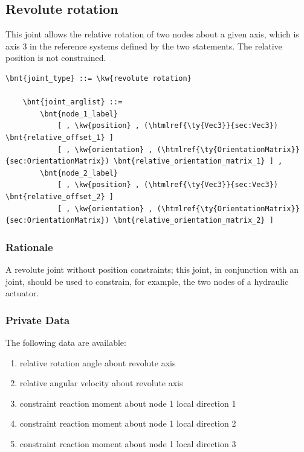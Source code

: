 \subsection{Revolute rotation}
\label{sec:EL:STRUCT:JOINT:REVOLUTE_ROTATION}
This joint allows the relative rotation of two nodes about
a given axis, which is axis 3 in the reference systems defined 
by the two  statements.
The relative position is not constrained.
\begin{Verbatim}[commandchars=\\\{\}]
    \bnt{joint_type} ::= \kw{revolute rotation}

    \bnt{joint_arglist} ::= 
        \bnt{node_1_label}
            [ , \kw{position} , (\htmlref{\ty{Vec3}}{sec:Vec3}) \bnt{relative_offset_1} ]
            [ , \kw{orientation} , (\htmlref{\ty{OrientationMatrix}}{sec:OrientationMatrix}) \bnt{relative_orientation_matrix_1} ] ,
        \bnt{node_2_label}
            [ , \kw{position} , (\htmlref{\ty{Vec3}}{sec:Vec3}) \bnt{relative_offset_2} ]
            [ , \kw{orientation} , (\htmlref{\ty{OrientationMatrix}}{sec:OrientationMatrix}) \bnt{relative_orientation_matrix_2} ]
\end{Verbatim}

\subsubsection{Rationale}
A revolute joint without position constraints; this joint, in conjunction
with an  joint, should be used to constrain, for example,
the two nodes of a hydraulic actuator.

\subsubsection{Private Data}
The following data are available:
\begin{enumerate}
\item {} relative rotation angle about revolute axis
\item {} relative angular velocity about revolute axis
\item {} constraint reaction moment about node 1 local direction 1
\item {} constraint reaction moment about node 1 local direction 2
\item {} constraint reaction moment about node 1 local direction 3
\end{enumerate}

